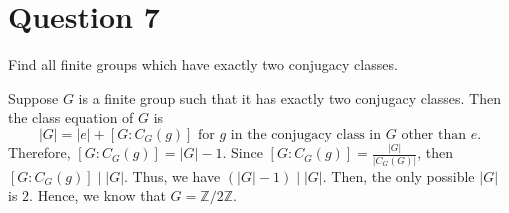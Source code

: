 \section{Question 7}

\begin{question}
    Find all finite groups which have exactly two conjugacy classes.
\end{question}

\begin{answer}
        Suppose $G$ is a finite group such that it has exactly two conjugacy classes. Then the class equation of $G$ is 
        \begin{equation}
            \lvert G \rvert = \lvert e \rvert + [G:C_G(g)] \text{ for $g$ in the conjugacy class in $G$ other than $e$}.
        \end{equation}
        Therefore, $[G:C_G(g)] = \lvert G \rvert - 1$. Since $[G:C_G(g)] = \tfrac{\lvert G \rvert}{\lvert C_G(G) \rvert}$, then $[G:C_G(g)] \mid \lvert G \rvert$. Thus, we have $(\lvert G \rvert - 1) \mid \lvert G \rvert$. Then, the only possible $\lvert G \rvert$ is $2$. Hence, we know that $G = \mathbb{Z}/2\mathbb{Z}$.
\end{answer}